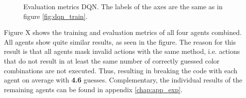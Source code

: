 \begin{figure}[H]
	\centering
	\qquad
	\caption[DQN Evaluation]{Evaluation metrics DQN. The labels of the axes are the same as in figure \ref{fig:dqn_train}.}	
	\label{fig:dqn_eval}
\end{figure}

Figure X shows the training and evaluation metrics of all four agents combined. All agents show quite similar results, as seen in the figure. The reason for this result is that all agents mask invalid actions with the same method, i.e. actions that do not result in at least the same number of correctly guessed color combinations are not executed. Thus, resulting in breaking the code with each agent on average with \textbf{4.6} guesses. Complementary, the individual results of the remaining agents can be found in appendix \ref{chap:app_exp}.

